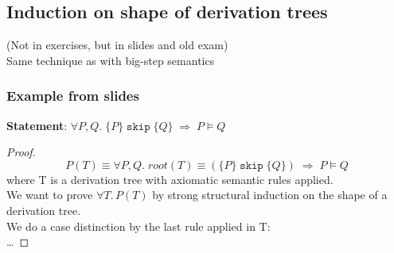 \documentclass{article}
\def\skipt{\texttt{skip}}
\begin{document}
\subsection{Induction on shape of derivation trees}
(Not in exercises, but in slides and old exam) \\
Same technique as with big-step semantics
\subsubsection{Example from slides}
\textbf{Statement}: $\forall P, Q. \; \{P\} \; \skipt \; \{Q\} \; \Rightarrow \; P \vDash Q$
\begin{proof}
    $$P(T)\equiv \forall P, Q. \; root(T)\equiv(\{P\} \; \skipt \; \{Q\}) \; \Rightarrow \; P \vDash Q$$
    where T is a derivation tree with axiomatic semantic rules applied. \\
    We want to prove $\forall T. \, P(T)$ by strong structural induction on the shape of a derivation tree. \\
    We do a case distinction by the last rule applied in T: \\
    \dots
\end{proof}
\end{document}
